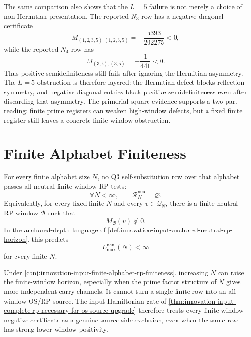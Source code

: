 \begin{principle}
\label{prin:innovation-input-primorial-square-diagonal-persistence}
The same comparison also shows that the $L=5$ failure is not merely a
choice of non-Hermitian presentation. The reported $N_3$ row has a
negative diagonal certificate
$$
M_{(1,2,3,5),(1,2,3,5)}
=
-\frac{5393}{202275}
<0,
$$
while the reported $N_4$ row has
$$
M_{(3,5),(3,5)}
=
-\frac1{441}
<0.
$$
Thus positive semidefiniteness still fails after ignoring the Hermitian
asymmetry. The $L=5$ obstruction is therefore layered: the Hermitian defect
blocks reflection symmetry, and negative diagonal entries block
positive semidefiniteness even after discarding that asymmetry. The
primorial-square evidence supports a two-part reading: finite prime
registers can weaken high-window defects, but a fixed finite register
still leaves a concrete finite-window obstruction.
\end{principle}

\section{Finite Alphabet Finiteness}
\label{sec:innovation-input-finite-alphabet-finiteness}

\begin{conjecture}
\label{conj:innovation-input-finite-alphabet-rp-finiteness}
For every finite alphabet size $N$, no Q3 self-substitution row over that
alphabet passes all neutral finite-window RP tests:
$$
\forall N<\infty,
\qquad
\mathcal R_N^{\mathrm{neu}}=\varnothing.
$$
Equivalently, for every fixed finite $N$ and every
$v\in\mathcal Q_N$, there is a finite neutral RP window
$\mathcal B$ such that
$$
M_{\mathcal B}(v)\not\succeq0.
$$
In the anchored-depth language of
\autoref{def:innovation-input-anchored-neutral-rp-horizon}, this predicts
$$
L_{\max}^{\mathrm{neu}}(N)<\infty
$$
for every finite $N$.
\end{conjecture}


\begin{principle}
\label{prin:innovation-input-finite-alphabet-delay-principle}
Under
\autoref{conj:innovation-input-finite-alphabet-rp-finiteness}, increasing
$N$ can raise the finite-window horizon, especially when the prime factor
structure of $N$ gives more independent carry channels. It cannot turn a
single finite row into an all-window OS/RP source. The input Hamiltonian
gate of
\autoref{thm:innovation-input-complete-rp-necessary-for-os-source-upgrade}
therefore treats every finite-window negative certificate as a genuine
source-side exclusion, even when the same row has strong lower-window
positivity.
\end{principle}

